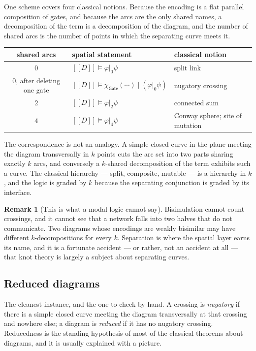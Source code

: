 \documentclass[11pt]{article}
\theoremstyle{definition}
\newtheorem{remark}{Remark}
\newcommand{\enc}[1]{[\![ #1 ]\!]}
\newcommand{\Gate}{\mathsf{Gate}}
\newcommand{\charf}[1]{\chi_{#1}}
\newcommand{\sep}{\mathbin{\vert}}
\newcommand{\ssep}[1]{\mathbin{\vert_{#1}}}
\begin{document}
One scheme covers four classical notions. Because the encoding is a flat parallel
composition of gates, and because the arcs are the only shared names, a
decomposition of the term is a decomposition of the diagram, and the number of
shared arcs is the number of points in which the separating curve meets it.

\begin{center}
\begin{tabular}{cll}
\hline
shared arcs & spatial statement & classical notion \\
\hline
$0$ & $\enc{D} \models \varphi \ssep{0} \psi$ & split link \\
$0$, after deleting one gate & $\enc{D} \models \charf{\Gate}(\cdots) \sep (\varphi \ssep{0} \psi)$ & nugatory crossing \\
$2$ & $\enc{D} \models \varphi \ssep{2} \psi$ & connected sum \\
$4$ & $\enc{D} \models \varphi \ssep{4} \psi$ & Conway sphere; site of mutation \\
\hline
\end{tabular}
\end{center}

The correspondence is not an analogy. A simple closed curve in the plane meeting
the diagram transversally in $k$ points cuts the arc set into two parts sharing
exactly $k$ arcs, and conversely a $k$-shared decomposition of the term exhibits
such a curve. The classical hierarchy --- split, composite, mutable --- is a
hierarchy in $k$, and the logic is graded by $k$ because the separating
conjunction is graded by its interface.

\begin{remark}[This is what a modal logic cannot say]
Bisimulation cannot count crossings, and it cannot see that a network falls into
two halves that do not communicate. Two diagrams whose encodings are weakly
bisimilar may have different $k$-decompositions for every $k$. Separation is
where the spatial layer earns its name, and it is a fortunate accident --- or
rather, not an accident at all --- that knot theory is largely a subject about
separating curves.
\end{remark}

\subsection{Reduced diagrams}\label{sec:reduced}

The cleanest instance, and the one to check by hand. A crossing is
\emph{nugatory} if there is a simple closed curve meeting the diagram
transversally at that crossing and nowhere else; a diagram is \emph{reduced} if it
has no nugatory crossing. Reducedness is the standing hypothesis of most of the
classical theorems about diagrams, and it is usually explained with a picture.
\end{document}
